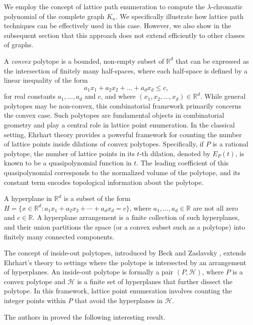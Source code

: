 \documentclass{birkjour}
\theoremstyle{definition}
\theoremstyle{remark}
\numberwithin{equation}{section}
\begin{document}
We employ the concept of lattice path enumeration to compute the 
\( \lambda \)-chromatic polynomial of the complete graph \( K_n \). We specifically illustrate how 
lattice path techniques can be effectively used in this case. However, we also show in the 
subsequent section that this approach does not extend efficiently to other classes of graphs.

A \textit{convex} polytope is a bounded, non-empty subset of \( \mathbb{R}^d \) that can be expressed as the intersection of finitely many half-spaces, where each half-space is defined by a linear inequality of the form
\[
a_1x_1 + a_2x_2 + \dots + a_dx_d \leq c,
\]
for real constants \( a_1, \dots, a_d \) and \( c \), and where \( (x_1, x_2, \dots, x_d) \in \mathbb{R}^d \). While general polytopes may be non-convex, this combinatorial framework primarily concerns the convex case. Such polytopes are fundamental objects in combinatorial geometry and play a central role in lattice point enumeration. In the classical setting, Ehrhart theory provides a powerful framework for counting the number of lattice points inside dilations of convex polytopes. Specifically, if \( P \) is a rational polytope, the number of lattice points in its \( t \)-th dilation, denoted by \( E_P(t) \), is known to be a quasipolynomial function in \( t \). The leading coefficient of this quasipolynomial corresponds to the normalized volume of the polytope, and its constant term encodes topological information about the polytope.

A hyperplane in \( \mathbb{R}^d \) is a subset of the form \( H = \{ x \in \mathbb{R}^d : a_1x_1 + a_2x_2 + \cdots + a_d x_d = c \} \), where \( a_1, \dots, a_d \in \mathbb{R} \) are not all zero and \( c \in \mathbb{R} \).  A hyperplane arrangement is a finite collection of such hyperplanes, and their union partitions the space (or a convex subset such as a polytope) into finitely many connected components.

The concept of inside-out polytopes, introduced by Beck and Zaslavsky \cite{BZ}, extends Ehrhart’s theory to settings where the polytope is intersected by an arrangement of hyperplanes. An inside-out polytope is formally a pair $(P, \mathcal{H})$, where $P$ is a convex polytope and $\mathcal{H}$ is a finite set of hyperplanes that further dissect the polytope. In this framework, lattice point enumeration involves counting the integer points within $P$ that avoid the hyperplanes in $\mathcal{H}$. 

The authors in \cite{BZ} proved the following interesting result.
\end{document}
